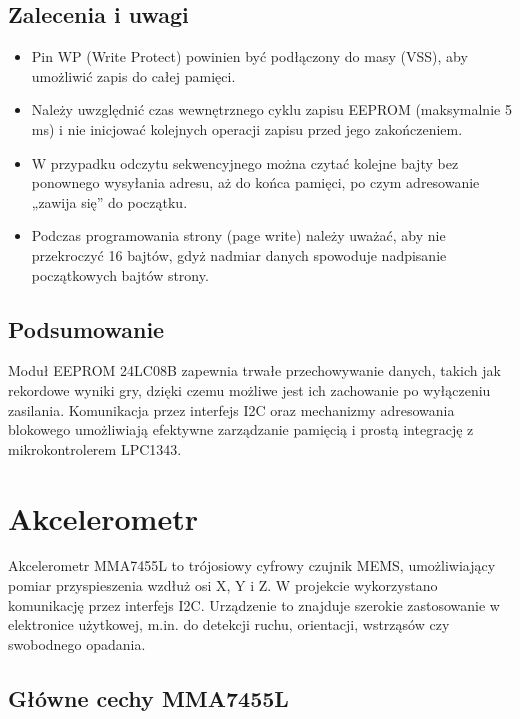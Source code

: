 \documentclass[a4paper,12pt]{report}
\begin{document}
\subsection*{Zalecenia i uwagi}

\begin{itemize}
    \item Pin WP (Write Protect) powinien być podłączony do masy (VSS), aby umożliwić zapis do całej pamięci.
    \item Należy uwzględnić czas wewnętrznego cyklu zapisu EEPROM (maksymalnie 5 ms) i nie inicjować kolejnych operacji zapisu przed jego zakończeniem.
    \item W przypadku odczytu sekwencyjnego można czytać kolejne bajty bez ponownego wysyłania adresu, aż do końca pamięci, po czym adresowanie „zawija się” do początku.
    \item Podczas programowania strony (page write) należy uważać, aby nie przekroczyć 16 bajtów, gdyż nadmiar danych spowoduje nadpisanie początkowych bajtów strony.
\end{itemize}

\subsection*{Podsumowanie}

Moduł EEPROM 24LC08B zapewnia trwałe przechowywanie danych, takich jak rekordowe wyniki gry, dzięki czemu możliwe jest ich zachowanie po wyłączeniu zasilania. Komunikacja przez interfejs I2C oraz mechanizmy adresowania blokowego umożliwiają efektywne zarządzanie pamięcią i prostą integrację z mikrokontrolerem LPC1343.

\section{Akcelerometr}

Akcelerometr MMA7455L to trójosiowy cyfrowy czujnik MEMS, umożliwiający pomiar przyspieszenia wzdłuż osi X, Y i Z. W projekcie wykorzystano komunikację przez interfejs I2C. Urządzenie to znajduje szerokie zastosowanie w elektronice użytkowej, m.in. do detekcji ruchu, orientacji, wstrząsów czy swobodnego opadania.

\subsection*{Główne cechy MMA7455L}
\end{document}
